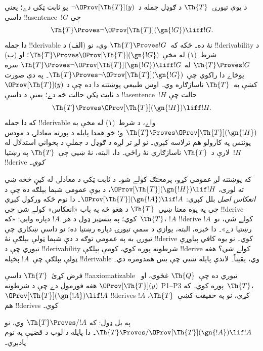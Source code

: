 \documentclass[../../../include/open-logic-section]{subfiles}
\begin{document}


د يوې تيورۍ~$\Th{T}$ د ګوډل جمله د~$\lnot
\OProv[\Th{T}](y)$ يو ثابت ټکی دے؛ يعنې داسې !!a{sentence}~$!G$
چې
\[
\Th{T} \Proves \lnot \OProv[\Th{T}](\gn{!G}) \liff !G.
\]
دا جمله !!{derivable} نۀ ده۔ ځکه که~$\Th{T} \Proves !G$ وي، نو
(الف) د !!{derivability} د شرط~(۱) له مخې
$\Th{T} \Proves \OProv[\Th{T}](\gn{!G})$؛ او (ب)
$\Th{T}
\Proves !G$ له
$\Th{T} \Proves \lnot \OProv[\Th{T}](\gn{!G})
\liff !G$ سره يوځاے دا راکوي چې
$\Th{T} \Proves \lnot \OProv[\Th{T}](\gn{!G})$۔ په دې صورت کښې
به~$\Th{T}$ ناسازګاره وي۔ اوس طبيعي پوښتنه دا ده چې د
$\OProv[\Th{T}](y)$ د ثابت ټکي حالت څه دے؛ يعنې د داسې
!!a{sentence}~$!H$ حالت چې
\[
\Th{T} \Proves \OProv[\Th{T}](\gn{!H}) \liff !H.
\]
که دا جمله !!{derivable} واے، د شرط~(۱) له مخې به
$\Th{T} \Proves \OProv[\Th{T}](\gn{!H})$ و؛ خو همدا پايله د
پورته معادلۍ د مودس پوننس په کارولو هم ترلاسه کېږي۔ نو لږ تر لږه
د ګوډل د جملې د پخواني استدلال له لارې د~$\Th{T}$ ناسازګاري نۀ
راځي۔ دا، البته، نۀ ښيي چې~$\Th{T}$ په رښتيا~$!H$
!!{derive} \emph{کوي}۔

که پوښتنه لږ عمومي کړو، پرمختګ کولے شو۔ د ثابت ټکي د معادلۍ
له کيڼ څخه ښي ته لوری،
$\OProv[\Th{T}](\gn{!H}) \lif !H$، د يوې عمومي شېما بېلګه ده
چې د \emph{انعکاس اصل} بلل کېږي:
$\OProv[\Th{T}](\gn{!A}) \lif !A$۔ دا نوم ځکه ورکول کېږي چې
په يوه معنا ښيي~$\Th{T}$ د هغو څه په باب «انعکاس» کولے شي چې
!!{derive} کوي؛ په بنسټيز ډول د هر~$!A$ دپاره وايي: «که~$\Th{T}$،
$!A$ !!{derive} کولے شي، نو~$!A$ رښتيا دے»۔ دا خبره، البته،
يوازې د سمې تيورۍ دپاره رښتيا ده؛ نو داسې ښکاري چې تيورۍ به
په عمومي توګه د دې شېما ټولې بېلګې نۀ !!{derive} کوي۔ نو يوه
کافي پياوړې تيوري چې د !!{derivability} شرطونه پوره کوي، کومې
بېلګې !!{derive} کولے شي؟ هغه ټولې بېلګې چې~$!A$ پخپله
!!{derivable} وي، يقيناً۔ لاندې پايله ښيي چې بس همدومره دي۔

\begin{thm}
فرض کړئ~$\Th{T}$ داسې !!a{axiomatizable} تيوري ده چې~$\Th{Q}$
غځوي، او~$\OProv[\Th{T}](y)$ هغه فورمول دے چې د
 شرطونه P1--P3 پوره کوي۔ که~$\Th{T}$،
$\OProv[\Th{T}](\gn{!A}) \lif !A$ !!{derive}s کړي، نو په حقيقت
کښې~$\Th{T}$، $!A$ هم !!{derive}s کوي۔
\end{thm}

په بل ډول: که $\Th{T} \Proves/ !A$ وي، نو
$\Th{T} \Proves/
\OProv[\Th{T}](\gn{!A}) \lif !A$۔ دا پايله د لوب د قضيې په نوم
يادېږي۔
\end{document}
